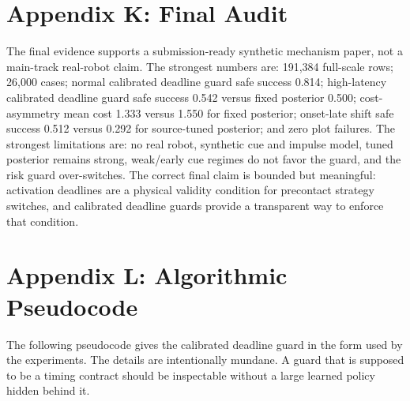 \documentclass{article}
\begin{document}
\section{Appendix K: Final Audit}

The final evidence supports a submission-ready synthetic mechanism paper, not a main-track real-robot claim. The strongest numbers are: 191,384 full-scale rows; 26,000 cases; normal calibrated deadline guard safe success 0.814; high-latency calibrated deadline guard safe success 0.542 versus fixed posterior 0.500; cost-asymmetry mean cost 1.333 versus 1.550 for fixed posterior; onset-late shift safe success 0.512 versus 0.292 for source-tuned posterior; and zero plot failures. The strongest limitations are: no real robot, synthetic cue and impulse model, tuned posterior remains strong, weak/early cue regimes do not favor the guard, and the risk guard over-switches. The correct final claim is bounded but meaningful: activation deadlines are a physical validity condition for precontact strategy switches, and calibrated deadline guards provide a transparent way to enforce that condition.

\section{Appendix L: Algorithmic Pseudocode}

The following pseudocode gives the calibrated deadline guard in the form used by the experiments. The details are intentionally mundane. A guard that is supposed to be a timing contract should be inspectable without a large learned policy hidden behind it.
\end{document}
